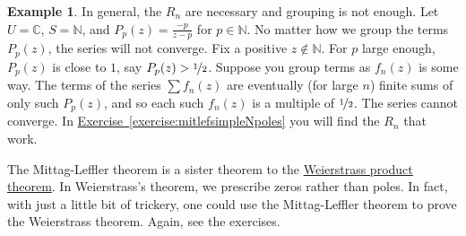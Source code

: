 \documentclass[12pt,openany]{book}
\newcommand{\C}{{\mathbb{C}}}
\newcommand{\N}{{\mathbb{N}}}
\theoremstyle{plain}
\theoremstyle{remark}
\theoremstyle{definition}
\theoremstyle{exercise}
\theoremstyle{example}
\newtheorem{example}[thm]{Example}
\newcommand{\exerciseref}[1]{\hyperref[#1]{Exercise~\ref*{#1}}}
\begin{document}
\begin{example}
In general, the $R_n$ are necessary and grouping is not enough.
Let $U = \C$, $S = \N$, and $P_p(z) = \frac{-p}{z-p}$ for $p \in \N$.
No matter how we group the terms $P_p(z)$,
the series will not converge.
Fix a positive $z \not\in \N$.
For $p$ large enough,
$P_p(z)$ is close to $1$, say $P_p(z) > \nicefrac{1}{2}$.
Suppose you group terms as $f_n(z)$ is some way.
The terms of the series $\sum f_n(z)$
are eventually (for large $n$)
finite sums of only such $P_p(z)$,
and so each such $f_n(z)$ is a multiple of $\nicefrac{1}{2}$.
The series cannot converge.
In \exerciseref{exercise:mitlefsimpleNpoles} you will find
the $R_n$ that work.
\end{example}

The Mittag-Leffler theorem is a sister theorem to
the
\hyperref[thm:weierprod]{Weierstrass product theorem}.
In Weierstrass's theorem,
we prescribe zeros rather than poles.  In fact, with just a little bit
of trickery, one could use the Mittag-Leffler theorem to prove
the Weierstrass theorem.  Again, see the exercises.
\end{document}
